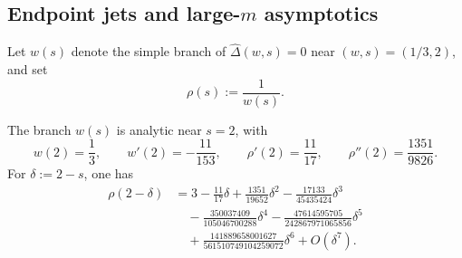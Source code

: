 \subsection{Endpoint jets and large-\texorpdfstring{$m$}{m} asymptotics}

Let \(w(s)\) denote the simple branch of \(\widehat\Delta(w,s)=0\) near
\((w,s)=(1/3,2)\), and set
\[
  \rho(s):=\frac{1}{w(s)}.
\]

\begin{proposition}
  \label{prop:sync-endpoint-jet}
  The branch \(w(s)\) is analytic near \(s=2\), with
  \[
    w(2)=\frac13,\qquad
    w'(2)=-\frac{11}{153},\qquad
    \rho'(2)=\frac{11}{17},\qquad
    \rho''(2)=\frac{1351}{9826}.
  \]
  For \(\delta:=2-s\), one has
  \begin{align*}
    \rho(2-\delta)
    &=3-\frac{11}{17}\delta+\frac{1351}{19652}\delta^2
      -\frac{17133}{45435424}\delta^3 \\
    &\quad
      -\frac{350037409}{105046700288}\delta^4
      -\frac{47614595705}{242867971065856}\delta^5 \\
    &\quad
      +\frac{141889658001627}{561510749104259072}\delta^6
      +O(\delta^7).
  \end{align*}
\end{proposition}

